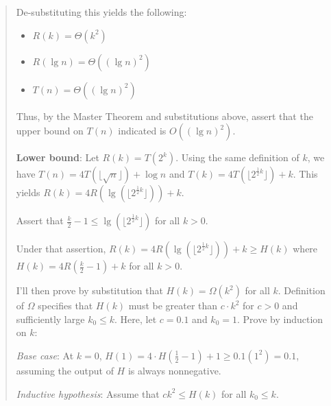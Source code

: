 \documentclass[11pt]{article}
\begin{document}
\begin{enumerate}[leftmargin=*]
\begin{enumerate}
\begin{enumerate}
\begin{quote}
          \medskip
          De-substituting this yields the following:
          \begin{itemize}
            \item $R(k) = \Theta(k^2)$ 
            \item $R(\lg n) = \Theta((\lg n)^2)$
            \item $T(n) = \Theta((\lg n)^2)$
          \end{itemize}

          Thus, by the Master Theorem and substitutions above, assert that the upper bound on $T(n)$ indicated is $O((\lg n)^2)$. 

          \medskip
          \textbf{Lower bound}:
          Let $R(k) = T(2^k)$. Using the same definition of $k$, we have $T(n) = 4T(\lfloor \sqrt{n} \rfloor) + \log n$ and $T(k) = 4T(\lfloor 2^{\frac{1}{2}k} \rfloor) + k$. This yields $R(k) = 4R(\lg(\lfloor 2^{\frac{1}{2}k} \rfloor)) + k$.

          \medskip
          Assert that $\frac{k}{2} - 1 \leq \lg(\lfloor 2^{\frac{1}{2}k} \rfloor)$ for all $k > 0$. 

          \medskip
          Under that assertion, $R(k) = 4R(\lg(\lfloor 2^{\frac{1}{2}k} \rfloor)) + k \geq H(k)$ where $H(k) = 4R(\frac{k}{2} - 1) + k$ for all $k > 0$. 

        \medskip
      I'll then prove by substitution that $H(k) = \Omega(k^2)$ for all $k$. Definition of $\Omega$ specifies that $H(k)$ must be greater than $c \cdot k^2$ for $c > 0$ and sufficiently large $k_0 \leq k$. Here, let $c = 0.1$ and $k_0 = 1$. Prove by induction on $k$: 

        \medskip
        \textit{Base case}: At $k = 0$, $H(1) = 4 \cdot H(\frac{1}{2} - 1) + 1 \geq 0.1(1^2) = 0.1$, assuming the output of $H$ is always nonnegative.

        \medskip
        \textit{Inductive hypothesis}: Assume that $ck^2 \leq H(k)$ for all $k_0 \leq k$. 


\end{quote}
\end{enumerate}
\end{enumerate}
\end{enumerate}
\end{document}
